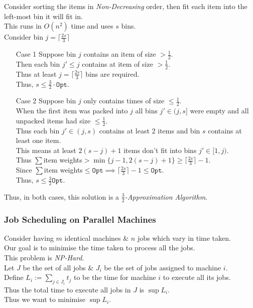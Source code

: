 \documentclass[11pt,a4paper]{article}
\begin{document}
Consider sorting the items in \textit{Non-Decreasing} order, then fit each item into the left-most bin it will fit in.\\
This runs in $O(n^2)$ time and uses $s$ bins.\\
Consider bin $j=\lceil\frac{2s}3\rceil$
\begin{itemize}
	\item[Case 1] Suppose bin $j$ contains an item of size $>\frac12$.\\
	Then each bin $j'\leq j$ contains at item of size $>\frac12$.\\
	Thus at least $j=\lceil\frac{2s}3\rceil$ bins are required.\\
	Thus, $s\leq\frac32\cdot\mathtt{Opt}$.
	\item[Case 2] Suppose bin $j$ only contains times of size $\leq\frac12$.\\
	When the first item was packed into $j$ all bins $j'\in(j,s]$ were empty and all unpacked items had size $\leq\frac12$.\\
	Thus each bin $j'\in(j,s)$ contains at least 2 items and bin $s$ contains at least one item.\\
	This means at least $2(s-j)+1$ items don't fit into bins $j'\in[1,j)$.\\
	Thus $\sum$item weights$>\min\{j-1,2(s-j)+1\}\geq\lceil\frac{2s}3\rceil-1$.\\
	Since $\sum$item weights$\leq\mathtt{Opt}\implies\lceil\frac{2s}3\rceil-1\leq\mathtt{Opt}$.\\
	Thus, $s\leq\frac{3}{2}\mathtt{Opt}$.
\end{itemize}
Thus, in both cases, this solution is a \textit{$\frac32$-Approximation Algorithm}.

\subsubsection{Job Scheduling on Parallel Machines}

Consider having $m$ identical machines \& $n$ jobs which vary in time taken.\\
Our goal is to minimise the time taken to process all the jobs.\\
\nb This problem is \textit{NP-Hard}.\\

Let $J$ be the set of all jobs \& $J_i$ be the set of jobs assigned to machine $i$.\\
Define $L_i:=\sum_{j\in J_i}t_j$ to be the time for machine $i$ to execute all its jobs.\\
Thus the total time to execute all jobs in $J$ is $\sup L_i$.\\
Thus we want to minimise $\sup L_i$.\\
\end{document}
